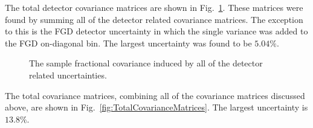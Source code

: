 \newline
\newline
The total detector covariance matrices are shown in Fig.~\ref{fig:DetectorCovarianceMatrices}.  These matrices were found by summing all of the detector related covariance matrices.  The exception to this is the FGD detector uncertainty in which the single variance was added to the FGD on-diagonal bin.  The largest uncertainty was found to be $5.04\%$.
\begin{figure}%
  \centering
  \caption{The sample fractional covariance induced by all of the detector related uncertainties.}
  \label{fig:DetectorCovarianceMatrices}
\end{figure}
The total covariance matrices, combining all of the covariance matrices discussed above, are shown in Fig.~\ref{fig:TotalCovarianceMatrices}.  The largest uncertainty is $13.8\%$.
